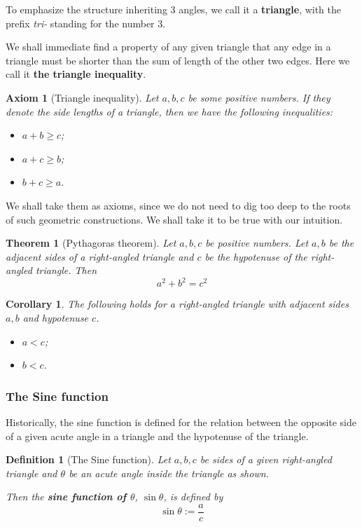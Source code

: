 \documentclass[12pt]{article}
\newtheorem{definition}{Definition}[section]
\newtheorem*{theorem}{Theorem}
\newtheorem*{corollary}{Corollary}
\newtheorem*{axiom}{Axiom}
\begin{document}
    To emphasize the structure inheriting 3 angles, we call it a \textbf{triangle}, with the prefix \textit{tri-} standing for the number 3.

    We shall immediate find a property of any given triangle that any edge in a triangle must be shorter than the sum of length of the other two edges. Here we call it \textbf{the triangle inequality}.

    \begin{axiom}[Triangle inequality]
        Let $a,b,c$ be some positive numbers. If they denote the side lengths of a triangle, then we have the following inequalities:\begin{itemize}
            \item $a+b\geq c$;
            \item $a+c\geq b$;
            \item $b+c\geq a$.
        \end{itemize}
    \end{axiom}

    We shall take them as axioms, since we do not need to dig too deep to the roots of such geometric constructions. We shall take it to be true with our intuition.

    \begin{theorem}[Pythagoras theorem]
        Let $a,b,c$ be positive numbers. Let $a,b$ be the adjacent sides of a right-angled triangle and $c$ be the hypotenuse of the right-angled triangle. Then $$a^2+b^2=c^2$$
    \end{theorem}

    \begin{corollary}
        The following holds for a right-angled triangle with adjacent sides $a,b$ and hypotenuse $c$.
        \begin{itemize}
            \item $a<c$;
            \item $b<c$.
        \end{itemize}
    \end{corollary}

    \subsubsection*{The Sine function}

    Historically, the sine function is defined for the relation between the opposite side of a given acute angle in a triangle and the hypotenuse of the triangle.

    \begin{definition}[The Sine function]
        Let $a,b,c$ be sides of a given right-angled triangle and $\theta$ be an acute angle inside the triangle as shown.

        Then the \textbf{sine function of $\theta$}, $\sin{\theta}$, is defined by $$\sin{\theta}:=\frac{a}{c}$$
    \end{definition}
\end{document}
